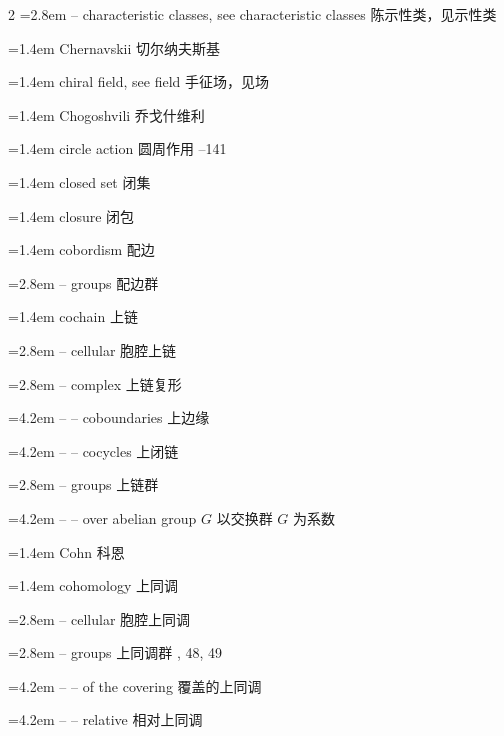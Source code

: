 \begin{multicols}{2}
\noindent\hangindent=2.8em -- characteristic classes, see characteristic classes \quad 陈示性类，见示性类 \quad\par
\noindent\hangindent=1.4em Chernavskii \quad 切尔纳夫斯基 \par
\noindent\hangindent=1.4em chiral field, see field \quad 手征场，见场 \quad\par
\noindent\hangindent=1.4em Chogoshvili \quad 乔戈什维利 \par
\noindent\hangindent=1.4em circle action \quad 圆周作用 --141\par
\noindent\hangindent=1.4em closed set \quad 闭集 \par
\noindent\hangindent=1.4em closure \quad 闭包 \par
\noindent\hangindent=1.4em cobordism \quad 配边 \par
\noindent\hangindent=2.8em -- groups \quad 配边群 \par
\noindent\hangindent=1.4em cochain \quad 上链 \quad\par
\noindent\hangindent=2.8em -- cellular \quad 胞腔上链 \par
\noindent\hangindent=2.8em -- complex \quad 上链复形 \par
\noindent\hangindent=4.2em -- -- coboundaries \quad 上边缘 \par
\noindent\hangindent=4.2em -- -- cocycles \quad 上闭链 \par
\noindent\hangindent=2.8em -- groups \quad 上链群 \quad\par
\noindent\hangindent=4.2em -- -- over abelian group $G$ \quad 以交换群 $G$ 为系数 \par
\noindent\hangindent=1.4em Cohn \quad 科恩 \par
\noindent\hangindent=1.4em cohomology \quad 上同调 \quad\par
\noindent\hangindent=2.8em -- cellular \quad 胞腔上同调 \par
\noindent\hangindent=2.8em -- groups \quad 上同调群 , 48, 49\par
\noindent\hangindent=4.2em -- -- of the covering \quad 覆盖的上同调 \par
\noindent\hangindent=4.2em -- -- relative \quad 相对上同调 \par

\end{multicols}
